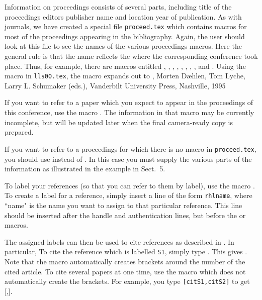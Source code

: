 {} Information on proceedings consists of several
parts, including
\sm
{} title of the proceedings
\sm
{} editors
\sm
{} publisher name and location
\sm
{} year of publication.
\ms
\noin As with journals, we have created a special file
{\tt proceed.tex} which contains macros for most of the proceedings
appearing in the bibliography.	Again, the user should look
at this file to see the names of the various proceedings macros.
Here the general rule is that the name reflects the 
where the corresponding conference took place.	Thus, for example,
there are macros entitled , , , ,
, ,
, , and .
Using the macro  in {\tt lls00.tex},
the macro  expands out to
\ms
{},
Morten D{\ae}hlen, Tom Lyche, Larry L. Schumaker (eds.),
Vanderbilt University Press, Nashville, 1995
\ms

If you want to refer to a paper which you expect to appear in
the proceedings of this conference, use
the macro . The information in that macro may be
currently incomplete, but will be updated later when
the final camera-ready copy is prepared.

If you want to refer to a proceedings for which
there is no macro in {\tt proceed.tex}, you should use
 instead of .  In this case you must supply
the various parts of the information as illustrated in the
 example in Sect.~5.

To label your references (so that you can refer to
them by label), use the macro .
To create a label for a reference, simply
insert a line of the form {\tt \back{}rhl\lb{}name\rb{}},
where ``name" is the name you want to assign
to that particular reference.  This line should be inserted after
the handle and authentication lines, but before the 
or  macros.

The assigned labels can then be
used to cite references as described in \cite{S2}.
In particular, To cite the reference which is
labelled {\tt S1}, simply type .
This gives \cite{S1}. Note that the macro  automatically
creates brackets around the number of the cited article.
To cite several papers at one time, use the macro  which
does not automatically create the brackets.  For example,
you type {\tt [\back{}cit\lb{}S1\rb{},\back{}cit\lb{}S2\rb{}]} to get
[,].


